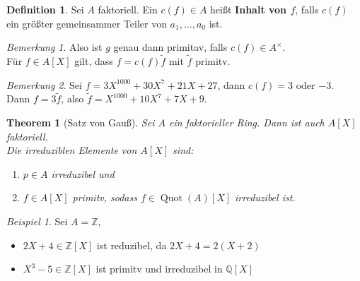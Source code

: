\documentclass[10pt,a4paper]{article}
\newcommand{\Z}{\ensuremath{\mathbb{Z}}}
\newcommand{\Q}{\ensuremath{\mathbb{Q}}}
\newcommand{\Quot}{\operatorname{Quot}}
\newcounter{thm}[section]
\theoremstyle{definition}
\newtheorem{definition}[thm]{Definition}
\theoremstyle{plain}
\newtheorem{theorem}[thm]{Theorem}
\theoremstyle{remark}
\newtheorem*{bem*}{Bemerkung}
\newtheorem*{exm*}{Beispiel}
\begin{document}
\addtocounter{thm}{-1}
\begin{definition}
	Sei $A$ faktoriell. Ein $c(f)\in A$ heißt \textbf{Inhalt von $f$}, falls $c(f)$ ein größter gemeinsammer Teiler von $a_1,...,a_0$ ist.\\
\end{definition}
\begin{bem*}
	Also ist $g$ genau dann primitav, falls $c(f)\in A^\times$.\\
	Für $f\in A[X]$ gilt, dass $f=c(f)\tilde{f}$ mit $\tilde{f}$ primitv.
\end{bem*}
\begin{bem*}
	Sei $f=3X^{1000}+30X^7+21X+27$, dann $c(f)=3$ oder $-3$.\\
	Dann $f=3\tilde{f}$, also $\tilde{f}=X^{1000}+10X^7+7X+9$.
\end{bem*}

\begin{theorem}[Satz von Gauß]\label{704Gauss}
	Sei $A$ ein faktorieller Ring. Dann ist auch $A[X]$ faktoriell.\\
	Die irreduziblen Elemente von $A[X]$ sind:
	\begin{enumerate}
		\item $p\in A$ irreduzibel und
		\item $f\in A[X]$ primitv, sodass $f\in \Quot(A)[X]$ irreduzibel ist.
	\end{enumerate}
\end{theorem}
\begin{exm*}
	Sei $A=\Z$, 
	\begin{itemize}
		\item $2X+4\in\Z[X]$ ist reduzibel, da $2X+4=2(X+2)$
		\item $X^3-5\in\Z[X]$ ist primitv und irreduzibel in $\Q[X]$
	\end{itemize}
\end{exm*}
\end{document}
